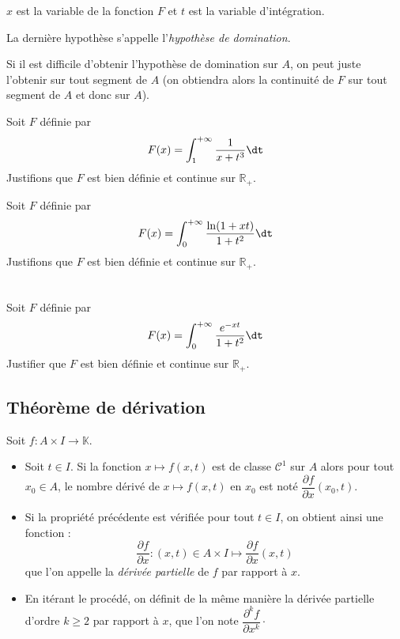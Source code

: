 \documentclass[a4paper,10pt]{report}
\begin{document}
\begin{rems}
\item $x$ est la variable de la fonction $F$ et $t$ est la variable d'intégration.
\item La dernière hypothèse s'appelle l'\textit{hypothèse de domination}.
\item Si il est difficile d'obtenir l'hypothèse de domination sur $A$, on peut juste l'obtenir sur tout segment de $A$ (on obtiendra alors la continuité de $F$ sur tout segment de $A$ et donc sur $A$).
\end{rems}

\medskip

\begin{ex} Soit $F$ définie par 
$$ F(x) = \int_{1}^{+ \infty} \frac{1}{x+t^3} \dt$$
Justifions que $F$ est bien définie et continue sur $\mathbb{R}_+$.

\vspace{8.5cm}
\end{ex}

\begin{ex} Soit $F$ définie par 
$$ F(x) = \int_{0}^{+ \infty} \frac{\ln(1+xt)}{1+t^2} \dt$$
Justifions que $F$ est bien définie et continue sur $\mathbb{R}_+$.

\vspace{8.5cm}
\end{ex}

\newpage

$\phantom{test}$

\vspace{6cm}

\begin{exa} Soit $F$ définie par 
$$ F(x) = \int_{0}^{+ \infty} \frac{e^{-xt}}{1+t^2} \dt$$
Justifier que $F$ est bien définie et continue sur $\mathbb{R}_+$.
\end{exa} 

\subsection{Théorème de dérivation}

\begin{defin} Soit $f : A \times I \rightarrow \mathbb{K}$.

\begin{itemize}
\item Soit $t \in I$. Si la fonction $x \mapsto f(x,t)$ est de classe $\mathcal{C}^1$ sur $A$ alors pour tout $x_0 \in A$, le nombre dérivé de $x \mapsto f(x,t)$ en $x_0$ est noté $\dfrac{\partial f}{\partial x} (x_0,t)$.
\item Si la propriété précédente est vérifiée pour tout $t \in I$, on obtient ainsi une fonction :
$$ \dfrac{\partial f}{\partial x} : (x,t) \in A \times I \mapsto \dfrac{\partial f}{\partial x}(x,t)$$
que l'on appelle la \textit{dérivée partielle} de $f$ par rapport à $x$.
\item En itérant le procédé, on définit de la même manière la dérivée partielle d'ordre $k \geq 2$ par rapport à $x$, que l'on note $\dfrac{\partial^k f}{\partial x^k} \cdot$
\end{itemize}
\end{defin}
\end{document}

